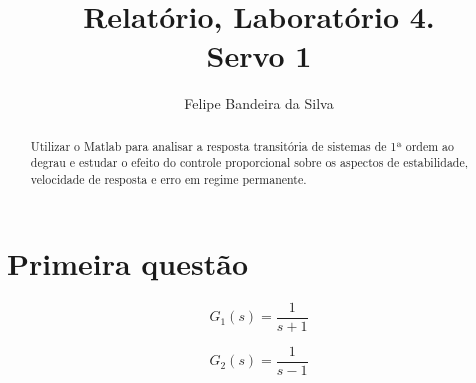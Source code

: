 \documentclass[paper=a4, fontsize=11pt]{article}
\title{Relatório, Laboratório 4.\\Servo 1}
\author{Felipe Bandeira da Silva}
\begin{document}
\maketitle

\begin{abstract}
Utilizar o Matlab para analisar a resposta transitória de sistemas de 1ª ordem
ao degrau e estudar o efeito do controle proporcional sobre os aspectos de
estabilidade, velocidade de resposta e erro em regime permanente.
\end{abstract}


\newpage

\section{Primeira questão}

\begin{equation}
    G_1(s) = \frac{1}{s+1}
\end{equation}

\begin{equation}
    G_2(s) = \frac{1}{s-1}
\end{equation}

\begin{lstlisting}
\end{lstlisting}
\end{document}
